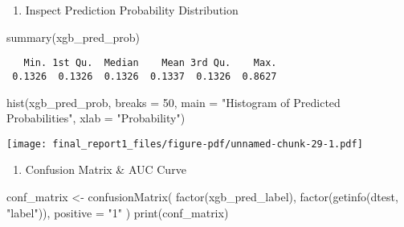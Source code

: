 \documentclass[
  11pt,
  letterpaper,
  DIV=11,
  numbers=noendperiod]{scrartcl}
\newenvironment{Shaded}{}{}
\newcommand{\AttributeTok}[1]{\textcolor[rgb]{0.84,0.23,0.29}{#1}}
\newcommand{\DecValTok}[1]{\textcolor[rgb]{0.00,0.36,0.77}{#1}}
\newcommand{\FunctionTok}[1]{\textcolor[rgb]{0.44,0.26,0.76}{#1}}
\newcommand{\NormalTok}[1]{\textcolor[rgb]{0.14,0.16,0.18}{#1}}
\newcommand{\OtherTok}[1]{\textcolor[rgb]{0.44,0.26,0.76}{#1}}
\newcommand{\StringTok}[1]{\textcolor[rgb]{0.01,0.18,0.38}{#1}}
\providecommand{\tightlist}{%
  \setlength{\itemsep}{0pt}\setlength{\parskip}{0pt}}\usepackage{longtable,booktabs,array}
\begin{document}
\begin{enumerate}
\def\labelenumi{\arabic{enumi}.}
\setcounter{enumi}{3}
\tightlist
\item
  Inspect Prediction Probability Distribution
\end{enumerate}

\begin{Shaded}
\begin{Highlighting}[]
\FunctionTok{summary}\NormalTok{(xgb\_pred\_prob)}
\end{Highlighting}
\end{Shaded}

\begin{verbatim}
   Min. 1st Qu.  Median    Mean 3rd Qu.    Max. 
 0.1326  0.1326  0.1326  0.1337  0.1326  0.8627 
\end{verbatim}

\begin{Shaded}
\begin{Highlighting}[]
\FunctionTok{hist}\NormalTok{(xgb\_pred\_prob, }\AttributeTok{breaks =} \DecValTok{50}\NormalTok{, }\AttributeTok{main =} \StringTok{"Histogram of Predicted Probabilities"}\NormalTok{, }\AttributeTok{xlab =} \StringTok{"Probability"}\NormalTok{)}
\end{Highlighting}
\end{Shaded}

\texttt{[image: final\_report1\_files/figure-pdf/unnamed-chunk-29-1.pdf]}

\begin{enumerate}
\def\labelenumi{\arabic{enumi}.}
\setcounter{enumi}{4}
\tightlist
\item
  Confusion Matrix \& AUC Curve
\end{enumerate}

\begin{Shaded}
\begin{Highlighting}[]
\NormalTok{conf\_matrix }\OtherTok{\textless{}{-}} \FunctionTok{confusionMatrix}\NormalTok{(}
  \FunctionTok{factor}\NormalTok{(xgb\_pred\_label),}
  \FunctionTok{factor}\NormalTok{(}\FunctionTok{getinfo}\NormalTok{(dtest, }\StringTok{"label"}\NormalTok{)),}
  \AttributeTok{positive =} \StringTok{"1"}
\NormalTok{)}
\FunctionTok{print}\NormalTok{(conf\_matrix)}
\end{Highlighting}
\end{Shaded}
\end{document}
